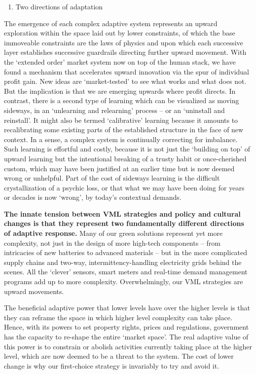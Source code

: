 \documentclass[
]{book}
\providecommand{\tightlist}{%
  \setlength{\itemsep}{0pt}\setlength{\parskip}{0pt}}
\begin{document}
\begin{enumerate}
\def\labelenumi{\arabic{enumi}.}
\setcounter{enumi}{2}
\tightlist
\item
  Two directions of adaptation
\end{enumerate}

The emergence of each complex adaptive system represents an upward
exploration within the space laid out by lower constraints, of which the base immoveable constraints
are the laws of physics and upon which each successive layer establishes successive guardrails
directing further upward movement.
With the `extended order' market system now on top of the human stack, we have found a
mechanism that accelerates upward innovation via the spur of individual profit gain. New ideas are
`market-tested' to see what works and what does not. But the implication is that we are emerging
upwards where profit directs.
In contrast, there is a second type of learning which can be visualized as moving sideways, in an
`unlearning and relearning' process -- or an `uninstall and reinstall'. It might also be termed
`calibrative' learning because it amounts to recalibrating some existing parts of the established
structure in the face of new context. In a sense, a complex system is continually correcting for
imbalance.
Such learning is effortful and costly, because it is not just the `building on top' of upward learning
but the intentional breaking of a trusty habit or once-cherished custom, which may have been
justified at an earlier time but is now deemed wrong or unhelpful.
Part of the cost of sideways
learning is the difficult crystallization of a psychic loss, or that what we may have been doing for
years or decades is now `wrong', by today's contextual demands.

\textbf{The innate tension between VML strategies and policy and
cultural changes is that they represent two fundamentally different directions of adaptive
response.}
Many of our green solutions represent yet more complexity, not just in the
design of more high-tech components -- from intricacies of new batteries to advanced materials -- but
in the more complicated supply chains and two-way, intermittency-handling electricity grids behind
the scenes. All the `clever' sensors, smart meters and real-time demand management programs add
up to more complexity. Overwhelmingly, our VML strategies are upward movements.

The beneficial adaptive power that lower levels have over the higher levels is that they can reframe
the space in which higher level complexity can take place. Hence, with its powers to set property
rights, prices and regulations, government has the capacity to re-shape the entire `market space'. The
real adaptive value of this power is to constrain or abolish activities currently taking place at the
higher level, which are now deemed to be a threat to the system.
The cost of lower change is why our first-choice strategy is invariably to try and avoid it.
\end{document}
